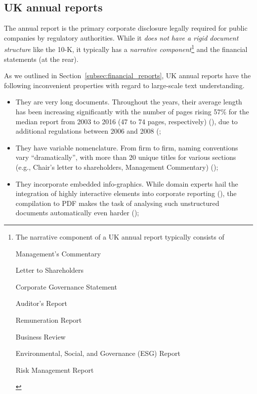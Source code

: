 \subsection{UK annual reports}\label{subsec:uk-annual-reports}
The annual report is the primary corporate disclosure legally required for public companies by regulatory authorities.
While it \emph{does not have a rigid document structure} like the 10-K, it typically has a \emph{narrative component}\footnote{The narrative component of a UK annual report typically consists of
\begin{enumerate*}
    \item Management's Commentary
    \item Letter to Shareholders
    \item Corporate Governance Statement
    \item Auditor's Report
    \item Remuneration Report
    \item Business Review
    \item Environmental, Social, and Governance (ESG) Report
    \item Risk Management Report
\end{enumerate*}
} and the financial statements (at the rear).

As we outlined in Section~\ref{subsec:financial_reports}, UK annual reports have the following inconvenient properties with regard to large-scale text understanding.
\begin{itemize}
    \item They are very long documents.
    Throughout the years, their average length has been increasing significantly with the number of pages rising 57\% for the median report from 2003 to 2016 (47 to 74 pages, respectively) (\cite{lewis_young_2019}), due to additional regulations between 2006 and 2008 (\cite{el-haj2019retrieving};
    \item They have variable nomenclature.
    From firm to firm, naming conventions vary \enquote{dramatically}, with more than 20 unique titles for various sections (e.g., Chair's letter to shareholders, Management Commentary) (\cite{lewis_young_2019});
    \item They incorporate embedded info-graphics.
    While domain experts hail the integration of highly interactive elements into corporate reporting (\cite{kriz2016future}), the compilation to PDF makes the task of analysing such unstructured documents automatically even harder (\cite{lewis_young_2019});
\end{itemize}

